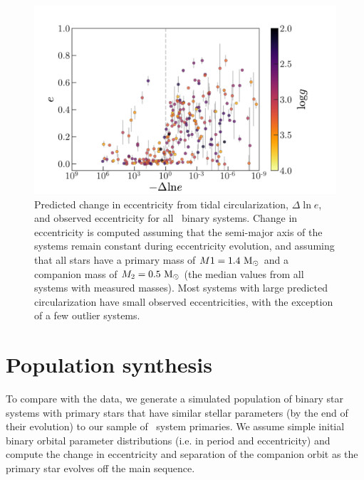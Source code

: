 \documentclass[modern, letterpaper]{aastex62}
\newcommand{\apogee}{\project{\acronym{APOGEE}}}
\begin{document}
\begin{figure}[h]
\begin{center}
\includegraphics[width=\textwidth]{dlne}
\end{center}
\caption{%
Predicted change in eccentricity from tidal circularization, $\Delta \ln e$, and
observed eccentricity for all \apogee\ binary systems.
Change in eccentricity is computed assuming that the semi-major axis of the
systems remain constant during eccentricity evolution, and assuming that all
stars have a primary mass of $M1 = 1.4~\mathrm{M}_\odot$ and a companion mass of $M_2 =
0.5~\mathrm{M}_\odot$ (the median values from all systems with measured masses).
Most systems with large predicted circularization have small observed
eccentricities, with the exception of a few outlier systems.
\label{fig:dlne}
}
\end{figure}


\section{Population synthesis}
\label{sec:theory}


To compare with the data, we generate a simulated population of binary star
systems with primary stars that have similar stellar parameters (by the end of
their evolution) to our sample of \apogee\ system primaries.
We assume simple initial binary orbital parameter distributions (i.e. in period
and eccentricity) and compute the change in eccentricity and separation of the
companion orbit as the primary star evolves off the main sequence.
\end{document}
